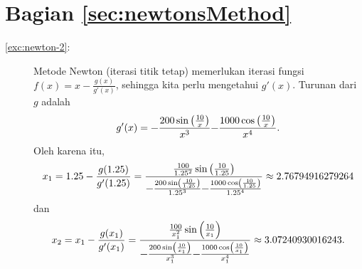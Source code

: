 \section*{Bagian \ref{sec:newtonsMethod}}
\begin{description}
\item [{\ref{exc:newton-2}:}] Metode Newton (iterasi titik tetap) memerlukan
iterasi fungsi $f(x)=x-\frac{g(x)}{g'(x)}$, sehingga kita perlu mengetahui
$g'(x)$. Turunan dari $g$ adalah
\[
g'(x)=\text{\textminus}\frac{200\sin\left(\frac{10}{x}\right)}{x^{3}}\text{\textminus}\frac{1000\cos\left(\frac{10}{x}\right)}{x^{4}}.
\]
Oleh karena itu,
\[
x_{1}=1.25-\frac{g(1.25)}{g'(1.25)}=\frac{\frac{100}{1.25^{2}}\sin\left(\frac{10}{1.25}\right)}{\text{\textminus}\frac{200\sin\left(\frac{10}{1.25}\right)}{1.25^{3}}\text{\textminus}\frac{1000\cos\left(\frac{10}{1.25}\right)}{1.25^{4}}}\approx2.76794916279264
\]
 dan 
\[
x_{2}=x_{1}-\frac{g(x_{1})}{g'(x_{1})}=\frac{\frac{100}{x_{1}^{2}}\sin\left(\frac{10}{x_{1}}\right)}{\text{\textminus}\frac{200\sin\left(\frac{10}{x_{1}}\right)}{x_{1}^{3}}\text{\textminus}\frac{1000\cos\left(\frac{10}{x_{1}}\right)}{x_{1}^{4}}}\approx3.07240930016243.
\]


\end{description}
